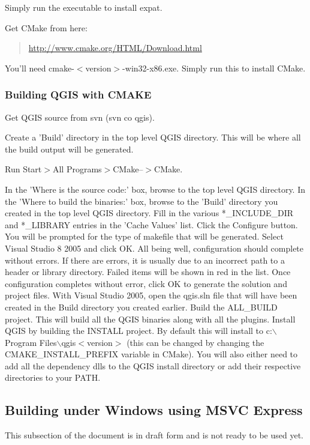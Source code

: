 Simply run the executable to install expat.

\hypertarget{toc89}{}
Get CMake from here:

	\begin{quotation}
\url{http://www.cmake.org/HTML/Download.html}
	\end{quotation}
You'll need cmake-$<$version$>$-win32-x86.exe. Simply run this to install CMake.

\hypertarget{toc90}{}
\subsubsection{Building QGIS with CMAKE}
Get QGIS source from svn (svn co  qgis).

Create a 'Build' directory in the top level QGIS directory. This will be where all the build output will be generated.

Run Start$>$All Programs$>$CMake--$>$CMake. 

In the 'Where is the source code:' box, browse to the top level QGIS directory. In the 'Where to build the binaries:' box, browse to the 'Build' directory you created in the top level QGIS directory.
Fill in the various *\_INCLUDE\_DIR and *\_LIBRARY entries in the 'Cache Values' list.
Click the Configure button. You will be prompted for the type of makefile that will be generated. Select Visual Studio 8 2005 and click OK.
All being well, configuration should complete without errors. If there are errors, it is usually due to an incorrect path to a header or library directory. Failed items will be shown in red in the list.
Once configuration completes without error, click OK to generate the solution and project files.
With Visual Studio 2005, open the qgis.sln file that will have been created in the Build directory you created earlier.
Build the ALL\_BUILD project. This will build all the QGIS binaries along with all the plugins. Install QGIS by building the INSTALL project. By default this will install to c:$\backslash$Program Files$\backslash$qgis$<$version$>$ (this can be changed by changing the CMAKE\_INSTALL\_PREFIX variable in CMake). 
You will also either need to add all the dependency dlls to the QGIS install directory or add their respective directories to your PATH.

\hypertarget{toc91}{}
\subsection{Building under Windows using MSVC Express}
This subsection of the document is in draft form and is not ready to be used
yet.


